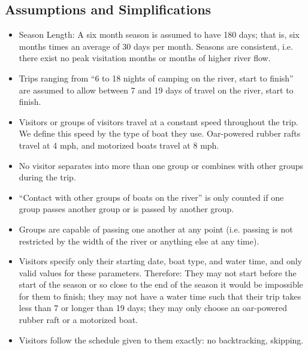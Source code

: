 \documentclass[11pt]{article} %
\begin{document}
\subsection{Assumptions and Simplifications}
\label{sec:assumptions}
\begin{itemize}
\item Season Length: A six month season is assumed to have 180 days; that is,
six months times an average of 30 days per month.  Seasons are consistent,
i.e. there exist no peak visitation months or months of higher river flow.

\item Trips ranging from ``6 to 18 nights of camping on the river, start to
finish'' are assumed to allow
between 7 and 19 days of travel on the river, start to finish.

\item Visitors or groups of visitors travel at a constant speed throughout the
trip.  We define this speed by the type of boat they use.  Oar-powered
rubber rafts travel at 4 mph, and motorized boats travel at 8 mph.

\item No visitor separates into more than one group or combines with other
groups during the trip.

\item ``Contact with other groups of boats on the river'' is only counted if
one group passes another group or is passed by another group.

\item Groups are capable of passing one another at any point (i.e. passing is
not restricted by the width of the river or anything else at any time).

\item Visitors specify only their starting date, boat type, and water time,
and only valid values for these parameters. Therefore: They may not start
before the start of the season or so close to the end of the season it
would be impossible for them to finish; they may not have a water time
such that their trip takes less than 7 or longer than 19 days; they may
only choose an oar-powered rubber raft or a motorized boat.

\item Visitors follow the schedule given to them exactly:
no backtracking, skipping.
\end{itemize}
\end{document}
